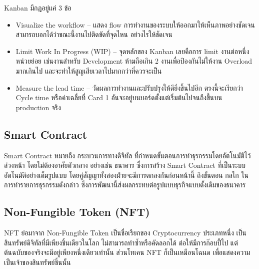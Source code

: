 \documentclass[12pt,oneside,openright,a4paper]{cpe-thai-project}
\begin{document}
\begin{enumerate}[label=\thesubsection.\arabic*,leftmargin=0pt,itemindent=2.5cm]
\begin{itemize}[leftmargin=0pt,itemindent=2.5cm]
Kanban มีกฎอยู่แค่ 3 ข้อ 
	\begin{itemize}[leftmargin=0pt,itemindent=3cm]
		\item Visualize the workflow – แสดง flow การทำงานของระบบให้ออกมาให้เห็นภาพอย่างชัดเจน สามารถบอกได้ว่าขณะนี้งานไปติดขัดที่จุดไหน 			อย่างไรให้ชัดเจน
		\item Limit Work In Progress (WIP) – จุดหลักของ Kanban เลยคือการ limit งานต่อหนึ่งหน่วยย่อย เช่นงานสำหรับ Development ห้ามถือเกิน	 			2 งานเพื่อป้องกันไม่ให้งาน Overload มากเกินไป และจะทำให้สูญเสียเวลาไปมากกว่าที่ควรจะเป็น
		\item Measure the lead time – วัดผลการทำงานและปรับปรุงให้ดียิ่งขึ้นไปอีก ตรงนี้จะเรียกว่า Cycle time หรือค่าเฉลี่ยที่ Card 1 							อันจะอยู่บนบอร์ดตั้งแต่เริ่มต้นไปจนถึงขึ้นบน production จริง
		\end{itemize}
	\end{itemize}
\end{enumerate}

\subsection{Smart Contract \cite{smartcontract}}
\tab Smart Contract หมายถึง กระบวนการทางดิจิทัล ที่กำหนดขั้นตอนการทำธุรกรรมโดยอัตโนมัติไว้ล่วงหน้า โดยไม่ต้องอาศัยตัวกลาง อย่างเช่น ธนาคาร ซึ่งการสร้าง Smart Contract ที่เป็นระบบอัตโนมัติอย่างเต็มรูปแบบ โดยคู่สัญญาทั้งสองฝ่ายจะมีการตกลงกันก่อนหน้านี้ ถึงขั้นตอน กลไก ในการทำรายการธุรกรรมดังกล่าว ซึ่งการพัฒนานี้ส่งผลกระทบต่อรูปแบบธุรกิจแบบดั้งเดิมของธนาคาร

\subsection{Non-Fungible Token (NFT) \cite{nft}}
\tab NFT ย่อมาจาก Non-Fungible Token เป็นชื่อเรียกของ Cryptocurrency ประเภทหนึ่ง เป็นสินทรัพย์ดิจิทัลที่มีเพียงชิ้นเดียวในโลก ไม่สามารถทำซ้ำหรือคัดลอกได้ ต่อให้มีการก๊อบปี้ไป แต่ต้นฉบับของจริงจะมีอยู่เพียงหนึ่งเดียวเท่านั้น ส่วนโทเคน NFT ก็เป็นเหมือนโฉนด เพื่อแสดงความเป็นเจ้าของสินทรัพย์ชิ้นนั้น
\end{document}
